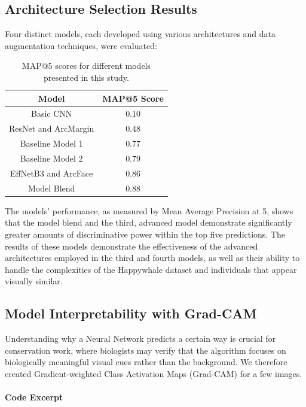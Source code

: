 \documentclass[twocolumn]{article}
\begin{document}
\subsection{Architecture Selection Results}

Four distinct models, each developed using various architectures and data augmentation techniques, were evaluated:

\begin{table}[ht!]
\centering
\begin{tabular}{|c|c|}
\hline
\textbf{Model} & \textbf{MAP@5 Score}\\ 
\hline
Basic CNN & 0.10 \\ 
\hline
ResNet and ArcMargin & 0.48 \\ 
\hline
Baseline Model 1 & 0.77 \\
\hline
Baseline Model 2 & 0.79 \\
\hline
EffNetB3 and ArcFace& 0.86 \\ 
\hline
Model Blend & 0.88 \\ 
\hline
\end{tabular}
\caption{MAP@5 scores for different models presented in this study.}
\label{tab:model_scores}
\end{table}

The models’ performance, as measured by Mean Average Precision at 5, shows that the model blend and the third, advanced model demonstrate significantly greater amounts of discriminative power within the top five predictions. The results of these models demonstrate the effectiveness of the advanced architectures employed in the third and fourth models, as well as their ability to handle the complexities of the Happywhale dataset and individuals that appear visually similar.

\subsection{Model Interpretability with Grad-CAM}

Understanding why a Neural Network predicts a certain way is crucial for conservation work, where biologists may verify that the algorithm focuses on biologically meaningful visual cues rather than the background. We therefore created Gradient-weighted Class Activation Maps (Grad-CAM) for a few images. 

\paragraph{Code Excerpt}
\end{document}
